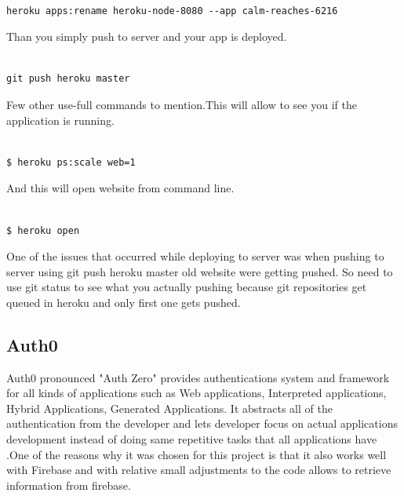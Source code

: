 \begin{itemize}
\bigbreak
\begin{verbatim}

heroku apps:rename heroku-node-8080 --app calm-reaches-6216

\end{verbatim}
\bigbreak

Than you simply push to server and your app is deployed.
\bigbreak
\begin{verbatim}

git push heroku master

\end{verbatim}
\bigbreak

Few other use-full commands to mention.This will allow to see you if the application is running.

\bigbreak
\begin{verbatim}

$ heroku ps:scale web=1

\end{verbatim}
\bigbreak

And this will open website from command line.

\bigbreak
\begin{verbatim}

$ heroku open

\end{verbatim}
\bigbreak

One of the issues that occurred while deploying to server was when pushing to server using git push heroku master old website were getting pushed. So need to use git status to see what you actually pushing because git repositories get queued in heroku and only first one gets pushed.

\subsection{Auth0}

Auth0 pronounced "Auth Zero" provides authentications system and framework for all kinds of applications such as Web applications, Interpreted applications, Hybrid Applications, Generated Applications. It abstracts all of the authentication from the developer and lets developer focus on actual applications development instead of doing same repetitive tasks that all applications have .One of the reasons why it was chosen for this project is that it also works well with Firebase and with relative small adjustments to the code allows to retrieve information from firebase.
\\


\end{itemize}
